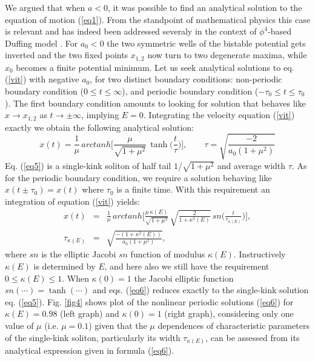 \documentclass[%
 aip,
cha,
 amsmath,amssymb,
preprint,
]{revtex4-2}
\begin{document}
We argued that when $a<0$, it was possible to find an analytical solution to the equation of motion (\ref{eq1}). From the standpoint of mathematical physics this case is relevant and has indeed been addressed severaly in the context of $\phi^4$-based Duffing model \cite{solduf2,solduf4,wig,chao}. For $a_0<0$ the two symmetric wells of the bistable potential gets inverted and the two fixed points $x_{1,2}$ now turn to two degenerate maxima, while $x_0$ becomes a finite potential minimum. Let us seek analytical solutions to eq. (\ref{vit}) with negative $a_0$, for two distinct boundary conditions: non-periodic boundary condition ($0 \leq t \leq \infty$), and periodic boundary condition ($-\tau_0 \leq t \leq \tau_0$). The first boundary condition amounts to looking for solution that behaves like $x\rightarrow x_{1,2}$ as $t\rightarrow \pm \infty$, implying $E=0$. Integrating the velocity equation (\ref{vit}) exactly we obtain the following analytical solution:
\begin{equation}
x(t)=\frac{1}{\mu}\,arctanh\biggl[\frac{\mu}{\sqrt{1+\mu^2}}\,\tanh\biggl(\frac{t}{\tau}\biggr)\biggr], \qquad \tau=\sqrt{\frac{-2}{a_0(1+\mu^2)}} \label{eq5}
\end{equation}
Eq. (\ref{eq5}) is a single-kink soliton of half tail $1/\sqrt{1+\mu^2}$ and average width $\tau$. As for the periodic boundary condition, we require a solution behaving like  $x(t\pm\tau_0)=x(t)$ where $\tau_0$ is a finite time. With this requirement an integration of equation (\ref{vit}) yields:
\begin{eqnarray}
x(t)&=&\frac{1}{\mu}\,arctanh\biggl[\frac{\mu\,\kappa(E)}{\sqrt{1+\mu^2}}\,\sqrt{\frac{2}{1+\kappa^2(E)}}\,sn \biggl(\frac{t}{\tau_{\kappa(E)}}\biggr)\biggr], \nonumber \\
\tau_{\kappa(E)}&=&\sqrt{\frac{-(1+\kappa^2(E))}{a_0(1+\mu^2)}}, \label{eq6}
\end{eqnarray}
where $sn$ is the elliptic Jacobi $sn$ function \cite{abra} of modulus $\kappa(E)$. Instructively $\kappa(E)$ is determined by $E$, and here also we still have the requirement $0\leq \kappa(E) \leq 1$. When $\kappa(0)=1$ the Jacobi elliptic function $sn(\cdots)=\tanh(\cdots)$ and eqs. (\ref{eq6}) reduces exactly to the single-kink solution eq. (\ref{eq5}). Fig. \ref{fig4} shows plot of the nonlinear periodic solutions (\ref{eq6}) for $\kappa(E)=0.98$ (left graph) and $\kappa(0)=1$ (right graph), considering only one value of $\mu$ (i.e. $\mu=0.1$) given that the $\mu$ dependences of characteristic parameters of the single-kink soliton, particularly its width $\tau_{\kappa(E)}$, can be assessed from its analytical expression given in formula (\ref{eq6}).
\end{document}
